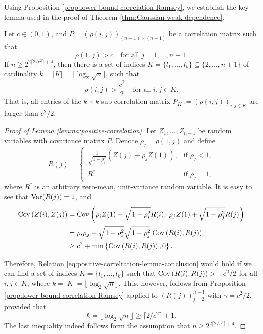 Using Proposition \ref{prop:lower-bound-correlation-Ramsey}, we establish the key lemma used in the proof of Theorem \ref{thm:Gaussian-weak-dependence}.


\begin{lemma} \label{lemma:positive-correlation}
  Let $c\in(0,1)$, and $P = \left(\rho(i,j)\right)_{(n+1)\times(n+1)}$ be a correlation matrix such that \begin{equation} \label{eq:positive-correlation-lemma-condition}
      \rho(1,j) > c \quad \mbox{for all } j = 1,\ldots,n+1.
  \end{equation}
  If $n \ge 2^{2\lceil2/c^2\rceil+4}$, then there is a set of indices $K = \{l_1, \ldots, l_k\}\subseteq \{2,\ldots,n+1\}$ of cardinality $k = |K| = \lfloor\log_2{\sqrt{n}}\rfloor$, such that 
  \begin{equation} \label{eq:positive-correltation-lemma-conclusion}
      \rho(i,j) > \frac{c^2}{2} \quad\mbox{for all } i,j\in K.
  \end{equation}
  That is, all entries of the $k\times k$ sub-correlation matrix $P_K:=\left(\rho(i,j)\right)_{i,j\in K}$ are larger than $c^2/2$.
\end{lemma}

\begin{proof}[Proof of Lemma \ref{lemma:positive-correlation}]
    Let $Z_1, \ldots, Z_{n+1}$ be random variables with covariance matrix $P$.
    Denote $\rho_j = \rho(1,j)$ and define 
    \begin{equation}
      R(j) = 
      \begin{cases}
        \frac{1}{\sqrt{1-\rho_j^2}}\left(Z(j) - \rho_j Z(1)\right), &\mbox{if } \rho_j<1,\\
        R^* &\mbox{if } \rho_j=1,
      \end{cases}
    \end{equation}
    where $R^*$ is an arbitrary zero-mean, unit-variance random variable.
    It is easy to see that ${\rm {Var}}(R(j)) = 1$, and
    \begin{align*}
    {\rm {Cov}}\left(Z(i), Z(j)\right) &= {\rm {Cov}}\left(\rho_i Z(1) + \sqrt{1-\rho_i^2} R(i), \; \rho_j Z(1) + \sqrt{1-\rho_j^2} R(j)\right) \\
        &= \rho_i\rho_j + \sqrt{1-\rho_i^2}\sqrt{1-\rho_j^2} \;{\rm {Cov}}\left(R(i), R(j)\right) \\
        &\ge c^2 + \min\left\{{\rm {Cov}}\left(R(i), R(j)\right), 0\right\}.
    \end{align*}
    
    Therefore, Relation \eqref{eq:positive-correltation-lemma-conclusion} would hold if we can find a set of indices $K = \{l_1,\ldots,l_k\}$ such that ${\rm {Cov}}\left(R(i),R(j)\right)>-c^2/2$ for all $i,j\in K$, where $k=|K|=\lfloor\log_2\sqrt{n}\rfloor$.
    This, however, follows from Proposition \ref{prop:lower-bound-correlation-Ramsey} applied to $\left(R(j)\right)_{j=2}^{n+1}$ with $\gamma = c^2/2$, provided that 
    $$
    k = \lfloor\log_2\sqrt{n}\rfloor \ge \lceil 2/c^2 \rceil + 1.
    $$
    The last inequality indeed follows form the assumption that $n \ge 2^{2\lceil2/c^2\rceil+4}$.
\end{proof}


